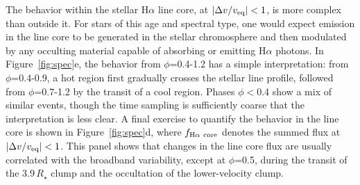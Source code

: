 \documentclass{nature3}
\begin{document}
The behavior within the stellar H$\alpha$ line core, at $|\Delta v /
v_{\rm eq}|<1$, is more complex than outside it.  For stars of
this age and spectral type, one would expect emission in the line core
to be generated in the stellar chromosphere
and then modulated by any occulting material capable of absorbing or
emitting H$\alpha$ photons.  In Figure~\ref{fig:spec}e, the behavior from
$\phi$=0.4-1.2 has a simple interpretation: from $\phi$=0.4-0.9, a hot
region first gradually crosses the stellar line profile, followed from
$\phi$=0.7-1.2 by the transit of a cool region.  Phases $\phi$$<$0.4
show a mix of similar events, though the time sampling is
sufficiently coarse that the interpretation is less clear.  A final
exercise to quantify the behavior in the line core is shown in
Figure~\ref{fig:spec}d, where $f_{\rm H\alpha\ core}$ denotes the
summed flux at $|\Delta v / v_{\rm eq}|<1$.  This panel shows that
changes in the line core flux are usually correlated with the
broadband variability, except at $\phi$=0.5, during the transit of the
3.9\,$R_\star$ clump and the occultation of the lower-velocity clump.
\end{document}
